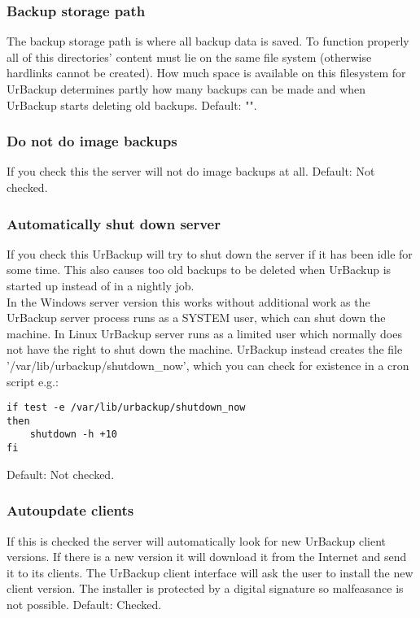\documentclass[a4paper,10pt]{article}
\begin{document}
\subsubsection{Backup storage path}

The backup storage path is where all backup data is saved. To function properly all of this directories' content must lie on the same file system (otherwise hardlinks cannot be created). How much space is available on this filesystem for UrBackup determines partly how many backups can be made and when UrBackup starts deleting old backups. Default: "".

\subsubsection{Do not do image backups}

If you check this the server will not do image backups at all. Default: Not checked.

\subsubsection{Automatically shut down server}

If you check this UrBackup will try to shut down the server if it has been idle for some time. This also causes too old backups to be deleted when UrBackup is started up instead of in a nightly job.\\
In the Windows server version this works without additional work as the UrBackup server process runs as a SYSTEM user, which can shut down the machine. In Linux UrBackup server runs as a limited user which normally does not have the right to shut down the machine. UrBackup instead creates the file '/var/lib/urbackup/shutdown\_now', which you can check for existence in a cron script e.g.:
\begin{verbatim}
if test -e /var/lib/urbackup/shutdown_now
then
	shutdown -h +10
fi
\end{verbatim}

Default: Not checked.

\subsubsection{Autoupdate clients}

If this is checked the server will automatically look for new UrBackup client versions. If there is a new version it will download it from the Internet and send it to its clients. The UrBackup client interface will ask the user to install the new client version. The installer is protected by a digital signature so malfeasance is not possible. Default: Checked.
\end{document}
